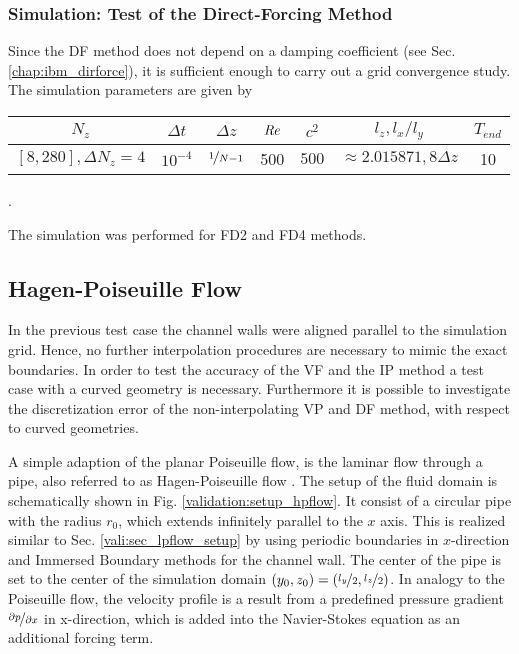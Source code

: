 \subsubsection{Simulation: Test of the Direct-Forcing Method}

Since the DF method does not depend on a damping coefficient (see Sec. \ref{chap:ibm_dirforce}),
it is sufficient enough to carry out a grid convergence study.  The simulation parameters are given by

\begin{center}
\vspace*{0.3ex}
\begin{tabular}{c|c|c|c|c|c|c }
 $ N_z  $                       &  $\Delta t$ & $\Delta z$            & $\mbox{\textit{Re}}$  & $c^2$   & $l_z, l_x/l_y$ & $T_{end}$\\
\hline
 $[8, 280], \Delta N_z = 4 $ &  $10^{-4}$ & $\nicefrac{1}{N - 1}$ & 500     & $500$   & $\approx{2.015871}, 8\Delta z$  & 10\\
\end{tabular}.
\vspace*{0.3ex}
\end{center}
The simulation was performed for FD2 and FD4 methods.

\subsection{Hagen-Poiseuille Flow}

\label{vali:section_hpflow_start}

In the previous test case the channel walls were aligned parallel to the simulation grid. Hence, no further interpolation procedures
are necessary to mimic the exact boundaries.
In order to test the accuracy of the VF and the IP method a test case with a curved geometry is necessary.
Furthermore it is possible to investigate the discretization error of the non-interpolating VP and DF method, with respect to curved geometries.

A simple adaption of the planar Poiseuille flow, is the laminar flow through a pipe, also referred to as Hagen-Poiseuille flow \citep{tritton88}.
The setup of the fluid domain is schematically shown in Fig. \ref{validation:setup_hpflow}.
It consist of a circular pipe with the radius $r_0$, which extends infinitely parallel to the $x$ axis.
This is realized similar to Sec. \ref{vali:sec_lpflow_setup} by using periodic boundaries in $x$-direction
and Immersed Boundary methods for the channel wall.
The center of the pipe is set to the center of the simulation domain ${(y_0, z_0) = (\nicefrac{l_y}{2}, \nicefrac{l_z}{2})}$.
In analogy to the Poiseuille flow, the velocity profile is a result from a predefined pressure gradient $\nicefrac{\partial p}{\partial x}$ in x-direction,
which  is added into the Navier-Stokes equation as an additional forcing term.

